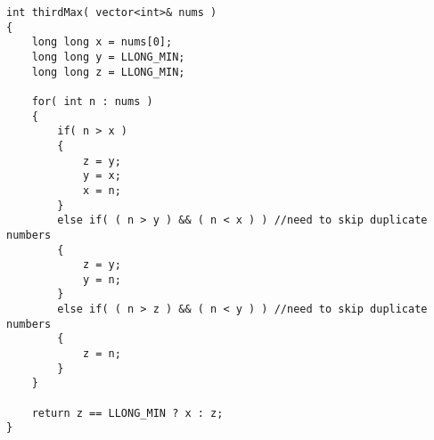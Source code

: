 \setcounter{lstlisting}{0}
\begin{lstlisting}[style=customc, caption={Swap}]
int thirdMax( vector<int>& nums )
{
    long long x = nums[0];
    long long y = LLONG_MIN;
    long long z = LLONG_MIN;

    for( int n : nums )
    {
        if( n > x )
        {
            z = y;
            y = x;
            x = n;
        }
        else if( ( n > y ) && ( n < x ) ) //need to skip duplicate numbers
        {
            z = y;
            y = n;
        }
        else if( ( n > z ) && ( n < y ) ) //need to skip duplicate numbers
        {
            z = n;
        }
    }

    return z == LLONG_MIN ? x : z;
}
\end{lstlisting}